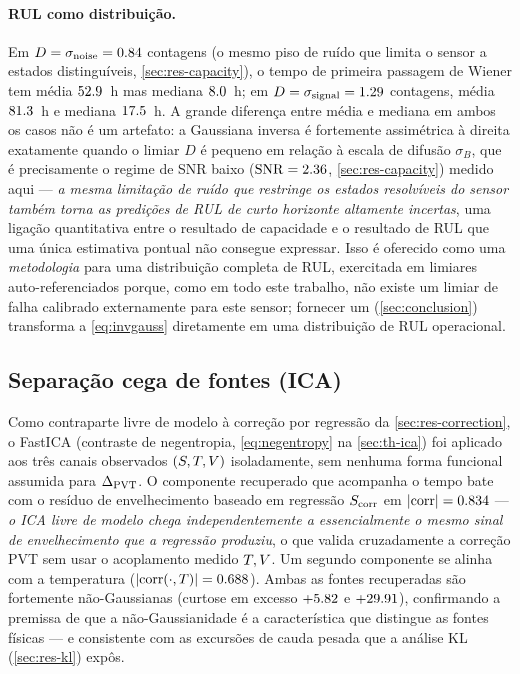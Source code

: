 \paragraph{RUL como distribuição.} Em $D=\sigma_{\text{noise}}=0.84$
contagens (o mesmo piso de ruído que limita o sensor a
\valCapacityStates{} estados distinguíveis, \cref{sec:res-capacity}), o
tempo de primeira passagem de Wiener tem média $52.9$~h mas
mediana $8.0$~h; em $D=\sigma_{\text{signal}}=1.29$
contagens, média $81.3$~h e mediana $17.5$~h. A
grande diferença entre média e mediana em ambos os casos não é um artefato:
a Gaussiana inversa é fortemente assimétrica à direita exatamente quando o
limiar $D$ é pequeno em relação à escala de difusão $\sigma_B$, que é
precisamente o regime de SNR baixo ($\mathrm{SNR}=2.36$,
\cref{sec:res-capacity}) medido aqui --- \emph{a mesma limitação de ruído
que restringe os estados resolvíveis do sensor também torna as predições de
RUL de curto horizonte altamente incertas}, uma ligação quantitativa entre o
resultado de capacidade e o resultado de RUL que uma única estimativa
pontual não consegue expressar. Isso é oferecido como uma
\emph{metodologia} para uma distribuição completa de RUL, exercitada em
limiares auto-referenciados porque, como em todo este trabalho, não existe
um limiar de falha calibrado externamente para este sensor; fornecer um
(\cref{sec:conclusion}) transforma a \cref{eq:invgauss} diretamente em uma
distribuição de RUL operacional.

\subsection{Separação cega de fontes (ICA)}
\label{sec:res-ica}
Como contraparte livre de modelo à correção por regressão da
\cref{sec:res-correction}, o FastICA \cite{hyvarinen2001} (contraste de
negentropia, \cref{eq:negentropy} na \cref{sec:th-ica}) foi aplicado aos três canais
observados $(S,T,V)$ isoladamente, sem nenhuma forma funcional
assumida para $\Delta_{\mathrm{PVT}}$. O componente recuperado que acompanha o tempo bate
com o resíduo de envelhecimento baseado em regressão $S_{\mathrm{corr}}$ em
$|\mathrm{corr}|=0.834$ --- \emph{o ICA livre de modelo chega
independentemente a essencialmente o mesmo sinal de envelhecimento que a
regressão produziu}, o que valida cruzadamente a correção PVT sem usar o
acoplamento medido $T,V$. Um segundo componente se alinha com a
temperatura ($|\mathrm{corr}(\cdot,T)|=0.688$). Ambas as
fontes recuperadas são fortemente não-Gaussianas (curtose em excesso
$+5.82$ e $+29.91$), confirmando a premissa de que a
não-Gaussianidade é a característica que distingue as fontes físicas --- e
consistente com as excursões de cauda pesada que a análise KL
(\cref{sec:res-kl}) expôs.

